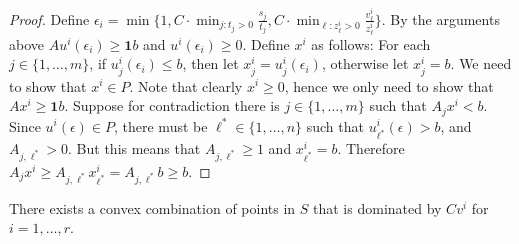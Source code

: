 \begin{proof}
	Define $\epsilon_i =\min\{1, C\cdot \min_{j: t_j >0}\frac{s_j}{t_j},C\cdot\min_{\ell: z^i_\ell>0}\frac{v^i_\ell}{z^i_\ell}\}$. By the arguments above $Au^i(\epsilon_i)\geq \textbf{1}b$ and $u^i(\epsilon_i)\geq 0$. Define $x^i$ as follows: For each $j\in \{1,\ldots,m\}$, if $u^i_j(\epsilon_i)\leq b$, then let $x^i_j=u^i_j(\epsilon_i)$, otherwise let $x^i_j=b$. We need to show that $x^i\in P$. Note that clearly $x^i\geq 0$, hence we only need to show that $Ax^i\geq \textbf{1}b$. Suppose for contradiction there is $j\in \{1,\ldots,m\}$ such that $A_jx^i <b$. Since $u^i(\epsilon)\in P$, there must be $\ell^*\in\{1,\ldots,n\}$ such that $u^i_{\ell^*}(\epsilon)>b$, and $A_{j,\ell^*}>0$. But this means that $A_{j,\ell^*}\geq 1$ and $x^i_{\ell^*}=b$. Therefore $A_jx^i \geq  A_{j,\ell^*}x^i_{\ell^*}= A_{j,\ell^*}b\geq b$. \end{proof}
\begin{lemma}\label{tightcutcomb}
	There exists a convex combination of points in $S$ that is dominated by $Cv^i$ for $i=1,\ldots,r$.
\end{lemma}
